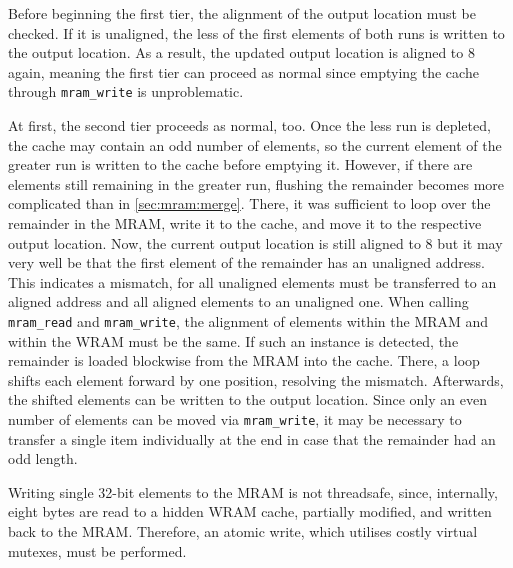 Before beginning the first tier, the alignment of the output location must be checked.
If it is unaligned, the less of the first elements of both runs is written to the output location.
As a result, the updated output location is aligned to \qty{8}{\byte} again, meaning the first tier can proceed as normal since emptying the cache through \lstinline|mram_write| is unproblematic.

At first, the second tier proceeds as normal, too.
Once the less run is depleted, the cache may contain an odd number of elements, so the current element of the greater run is written to the cache before emptying it.
However, if there are elements still remaining in the greater run, flushing the remainder becomes more complicated than in \cref{sec:mram:merge}.
There, it was sufficient to loop over the remainder in the \ac{MRAM}, write it to the cache, and move it to the respective output location.
Now, the current output location is still aligned to \qty{8}{\byte} but it may very well be that the first element of the remainder has an unaligned address.
This indicates a mismatch, for all unaligned elements must be transferred to an aligned address and all aligned elements to an unaligned one.
When calling \lstinline|mram_read| and \lstinline|mram_write|, the alignment of elements within the \ac{MRAM} and within the \ac{WRAM} must be the same.
If such an instance is detected, the remainder is loaded blockwise from the \ac{MRAM} into the cache.
There, a loop shifts each element forward by one position, resolving the mismatch.
Afterwards, the shifted elements can be written to the output location.
Since only an even number of elements can be moved via \lstinline|mram_write|, it may be necessary to transfer a single item individually at the end in case that the remainder had an odd length.

Writing single 32-bit elements to the \ac{MRAM} is not threadsafe, since, internally, eight bytes are read to a hidden \ac{WRAM} cache, partially modified, and written back to the \ac{MRAM}.
Therefore, an atomic write, which utilises costly virtual mutexes, must be performed.
